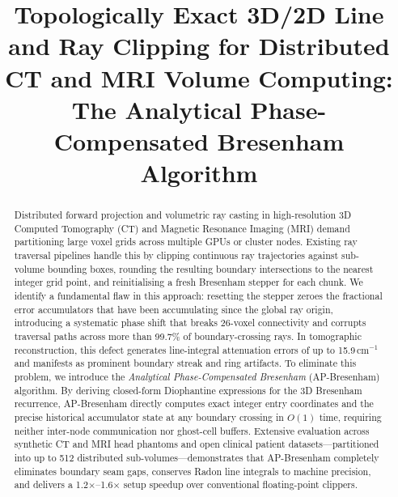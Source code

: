 \documentclass[conference]{IEEEtran}
\begin{document}
\title{Topologically Exact 3D/2D Line and Ray Clipping for Distributed CT and MRI Volume Computing: The Analytical Phase-Compensated Bresenham Algorithm}

\author{
}

\maketitle
{}

\begin{abstract}
Distributed forward projection and volumetric ray casting in high-resolution 3D Computed Tomography (CT) and Magnetic Resonance Imaging (MRI) demand partitioning large voxel grids across multiple GPUs or cluster nodes. Existing ray traversal pipelines handle this by clipping continuous ray trajectories against sub-volume bounding boxes, rounding the resulting boundary intersections to the nearest integer grid point, and reinitialising a fresh Bresenham stepper for each chunk. We identify a fundamental flaw in this approach: resetting the stepper zeroes the fractional error accumulators that have been accumulating since the global ray origin, introducing a systematic phase shift that breaks 26-voxel connectivity and corrupts traversal paths across more than 99.7\% of boundary-crossing rays. In tomographic reconstruction, this defect generates line-integral attenuation errors of up to 15.9\,cm$^{-1}$ and manifests as prominent boundary streak and ring artifacts. To eliminate this problem, we introduce the \emph{Analytical Phase-Compensated Bresenham} (AP-Bresenham) algorithm. By deriving closed-form Diophantine expressions for the 3D Bresenham recurrence, AP-Bresenham directly computes exact integer entry coordinates and the precise historical accumulator state at any boundary crossing in $O(1)$ time, requiring neither inter-node communication nor ghost-cell buffers. Extensive evaluation across synthetic CT and MRI head phantoms and open clinical patient datasets---partitioned into up to 512 distributed sub-volumes---demonstrates that AP-Bresenham completely eliminates boundary seam gaps, conserves Radon line integrals to machine precision, and delivers a 1.2$\times$--1.6$\times$ setup speedup over conventional floating-point clippers.
\end{abstract}
\end{document}
